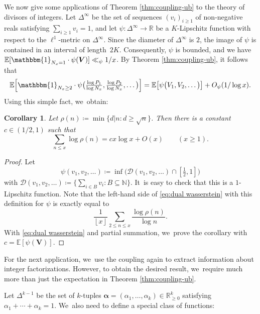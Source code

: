 \documentclass[10pt]{amsart}
\newcommand{\bV}{{\boldsymbol V}}
\newcommand{\RR}{\mathbb{R}}
\newcommand{\EE}{\mathbb{E}}
\newcommand{\boldalpha}{\boldsymbol{\alpha}}
\newcommand{\one}{\mathbbm{1}}
\newcommand{\floor}[1]{\left\lfloor #1 \right\rfloor}
\newcommand{\simplex}{\Delta^{k-1}}
\newcommand{\bg}{\big}
\newcommand{\bgg}{\Big}
\theoremstyle{plain}
\newtheorem{cor}{Corollary}[section]
\theoremstyle{definition}
\begin{document}

We now give some applications of Theorem \ref{thm:coupling-ub} to the theory of divisors of integers.
Let $\Delta^{\infty}$ be the set of sequences $(v_i)_{i \ge 1}$ of non-negative reals satisfying $\sum_{i \ge 1} v_i = 1$, and let $\psi\colon \Delta^{\infty} \to \RR$ be a $K$-Lipschitz function with respect to the $\ell^1$-metric on $\Delta^\infty$. Since the diameter of $\Delta^\infty$ is $2$, the image of $\psi$ is contained in an interval of length~$2K$. Consequently, $\psi$ is bounded, and we have $\EE[\one_{N_x = 1}\cdot \psi(\bV)] \ll_{\psi} 1/x$. By Theorem \ref{thm:coupling-ub}, it follows that
\begin{equation}
\label{eq:dual wasserstein}
\EE\bgg[\one_{N_x \ge 2}\cdot \psi\bg(\tfrac{\log P_1}{\log N_x}, \tfrac{\log P_2}{\log N_x}, \ldots\bg)\bgg] = \EE\bg[\psi\bg(V_1, V_2, \ldots\bg)\bg] + O_\psi(1/\log x).
\end{equation}
Using this simple fact, we~obtain:
\begin{cor}
Let $\rho(n) \coloneqq \min\{d|n : d\ge \sqrt n\}$. Then there is a constant $c \in (1/2,1)$ such that
\[
\sum_{n\le x} \log \rho(n) = cx\log x + O(x) \qquad (x \ge 1).
\]
\end{cor}

\begin{proof}
Let
\[
\psi(v_1, v_2, \ldots) \coloneqq \inf \big( \mathcal D(v_1, v_2, \ldots) \cap [\tfrac{1}{2}, 1]\big)
\]
with $\mathcal D(v_1, v_2, \ldots) \coloneqq \{\sum_{i \in B} v_i : B\subseteq \mathbb N\}$. It~is easy to check that this is a $1$-Lipschitz function. Note that the left-hand side of \eqref{eq:dual wasserstein} with this definition for $\psi$ is exactly equal to
\[
\frac{1}{\floor x} \sum_{2 \le n \le x} \frac{\log \rho(n)}{\log n}.
\]
With \eqref{eq:dual wasserstein} and partial summation, we~prove the corollary with $c = \EE[\psi(\bV)]$.
\end{proof}

For the next application, we~use the coupling again to extract information about integer factorizations. However, to obtain the desired result, we~require much more than just the expectation in Theorem \ref{thm:coupling-ub}.

Let $\simplex$ be the set of $k$-tuples $\boldalpha=(\alpha_1, \ldots, \alpha_k) \in \RR^k_{\ge 0}$ satisfying $\alpha_1+\cdots+\alpha_k=1$. We~also need to define a special class of functions:
\end{document}
